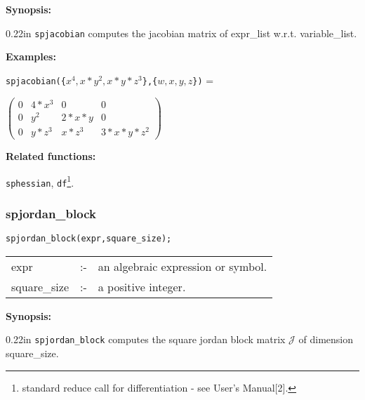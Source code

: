\textbf{Synopsis:} 

\begin{addtolength}{\leftskip}{0.22in}
\texttt{spjacobian} computes the jacobian matrix of expr\_list w.r.t. 
variable\_list. 

\end{addtolength}

\textbf{Examples:}

\hspace*{0.175in} 
\texttt{spjacobian(\{$x^4,x*y^2,x*y*z^3$\},\{$w,x,y,z$\})} = 

\vspace*{0.1in}

\begin{flushleft}  
\hspace*{0.175in}
\begin{math}        
\left( \begin{array}{cccc} 0 & 4*x^3 & 0 & 0 \\ 0 & y^2 & 2*x*y & 0 \\ 
0 & y*z^3 & x*z^3 & 3*x*y*z^2 
\end{array} \right)
\end{math}  
\end{flushleft}

\textbf{Related functions:}

\hspace*{0.175in} \texttt{sphessian}, \texttt{df}\footnote{standard reduce call 
for differentiation - see {\REDUCE} User's Manual[2].}.


\subsubsection{spjordan\_block}

\hspace*{0.175in} \texttt{spjordan\_block(expr,square\_size);}

\hspace*{0.1in} 
\begin{tabular}{l l l}
expr        &:-& an algebraic expression or symbol. \\
square\_size &:-& a positive integer.
\end{tabular}

\textbf{Synopsis:}

\begin{addtolength}{\leftskip}{0.22in}
\texttt{spjordan\_block} computes the square jordan block matrix $\mathcal{J}$
                of dimension square\_size. 

\end{addtolength}

